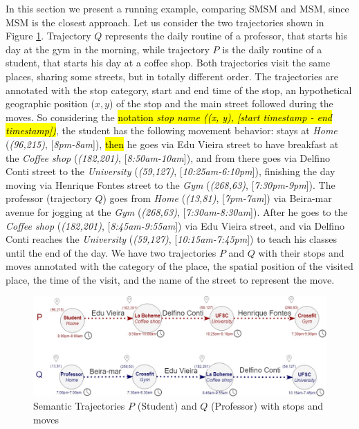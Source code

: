 \documentclass[12pt]{article}
\begin{document}
In this section we present a running example, comparing SMSM and MSM, since MSM is the closest approach.
Let us consider the two trajectories shown in Figure \ref{fig:bus}. Trajectory $Q$ represents the daily routine of a professor, that starts his day at the gym in the morning, while trajectory $P$ is the daily routine of a student, that starts his day at a coffee shop. Both trajectories visit the same places, sharing some streets, but in totally different order. The trajectories are annotated with the stop category, start and end time of the stop, an hypothetical geographic position ($x, y$) of the stop and the main street followed during the moves. So considering the \hl{notation \textit{stop name ((x, y), [start timestamp - end timestamp])}}, the student has the following movement behavior: stays at \textit{Home} (\textit{(96,215)}, [\textit{8pm-8am}]), \hl{then} he goes via Edu Vieira street to have breakfast at the \textit{Coffee shop} (\textit{(182,201)}, [\textit{8:50am-10am}]), and from there goes via Delfino Conti street to the \textit{University} (\textit{(59,127)}, [\textit{10:25am-6:10pm}]), finishing the day moving via Henrique Fontes street to the \textit{Gym} (\textit{(268,63)}, [\textit{7:30pm-9pm}]). The professor (trajectory $Q$) goes from \textit{Home} (\textit{(13,81)}, [\textit{7pm-7am}]) via Beira-mar avenue for jogging at the \textit{Gym} (\textit{(268,63)}, [\textit{7:30am-8:30am}]). After he goes to the \textit{Coffee shop} (\textit{(182,201)}, [\textit{8:45am-9:55am}]) via Edu Vieira street, and via Delfino Conti reaches the \textit{University} (\textit{(59,127)}, [\textit{10:15am-7:45pm}]) to teach his classes until the end of the day. We have two trajectories $P$ and $Q$ with their stops and moves annotated with the category of the place, the spatial position of the visited place, the time of the visit, and the name of the street to represent the move.
\begin{figure}[h!]
\centering
\includegraphics[width=1\textwidth]{Images/running_example.jpg}
\caption{\label{fig:bus} Semantic Trajectories $P$ (Student) and $Q$ (Professor) with stops and moves}
\end{figure}
\end{document}
